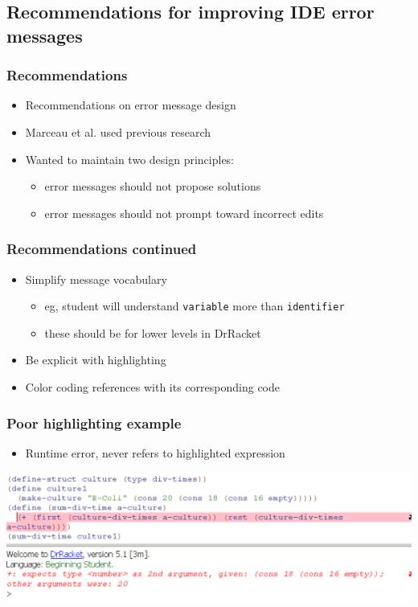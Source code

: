 \documentclass{beamer}
\begin{document}
\subsection[DrRacket recommendations]{Recommendations for improving IDE error messages}

\begin{frame}
	\frametitle{Recommendations}
		\begin{itemize}
			\item Recommendations on error message design
			\item Marceau et al. used previous research
			\item Wanted to maintain two design principles:
			\begin{itemize}
				\item error messages should not propose solutions
				\item error messages should not prompt toward incorrect edits
			\end{itemize}
		\end{itemize}

\end{frame}

\begin{frame}[fragile]
	\frametitle{Recommendations continued}
		\begin{itemize}
			\item Simplify message vocabulary
				\begin{itemize}
					\item eg, student will understand \texttt{variable} more than \texttt{identifier}
					\item these should be for lower levels in DrRacket
				\end{itemize}
			\item Be explicit with highlighting
			\item Color coding references with its corresponding code
		\end{itemize}

\end{frame}

\begin{frame}
	\frametitle{Poor highlighting example}
	\begin{itemize}
		\item Runtime error, never refers to highlighted expression
	\end{itemize}
		\includegraphics[keepaspectratio, width=0.95\paperwidth]{DrRacketNoClearReferent.pdf}
		\\
\end{frame}
\end{document}
